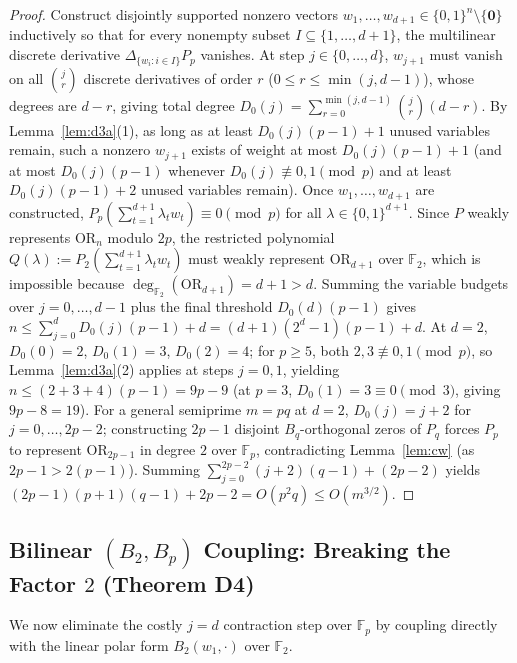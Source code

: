 \documentclass[11pt,a4paper]{article}
\theoremstyle{definition}
\newcommand{\F}{\mathbb{F}}
\newcommand{\OR}{\mathrm{OR}}
\begin{document}
\begin{proof}
Construct disjointly supported nonzero vectors $w_1,\dots,w_{d+1} \in \{0,1\}^n \setminus \{\mathbf{0}\}$ inductively so that for every nonempty subset $I \subseteq \{1,\dots,d+1\}$, the multilinear discrete derivative $\Delta_{\{w_i : i \in I\}} P_p$ vanishes. At step $j \in \{0,\dots,d\}$, $w_{j+1}$ must vanish on all $\binom{j}{r}$ discrete derivatives of order $r$ ($0 \le r \le \min(j, d-1)$), whose degrees are $d - r$, giving total degree $D_0(j) = \sum_{r=0}^{\min(j, d-1)} \binom{j}{r}(d - r)$. By Lemma~\ref{lem:d3a}(1), as long as at least $D_0(j)(p - 1) + 1$ unused variables remain, such a nonzero $w_{j+1}$ exists of weight at most $D_0(j)(p - 1) + 1$ (and at most $D_0(j)(p-1)$ whenever $D_0(j) \not\equiv 0,1 \pmod p$ and at least $D_0(j)(p-1)+2$ unused variables remain).
Once $w_1,\dots,w_{d+1}$ are constructed, $P_p(\sum_{t=1}^{d+1} \lambda_t w_t) \equiv 0 \pmod p$ for all $\lambda \in \{0,1\}^{d+1}$. Since $P$ weakly represents $\OR_n$ modulo $2p$, the restricted polynomial $Q(\lambda) := P_2(\sum_{t=1}^{d+1} \lambda_t w_t)$ must weakly represent $\OR_{d+1}$ over $\F_2$, which is impossible because $\deg_{\F_2}(\OR_{d+1}) = d + 1 > d$.
Summing the variable budgets over $j = 0,\dots,d-1$ plus the final threshold $D_0(d)(p-1)$ gives $n \le \sum_{j=0}^d D_0(j)(p-1) + d = (d+1)(2^d-1)(p-1) + d$. At $d = 2$, $D_0(0) = 2$, $D_0(1) = 3$, $D_0(2) = 4$; for $p \ge 5$, both $2, 3 \not\equiv 0, 1 \pmod p$, so Lemma~\ref{lem:d3a}(2) applies at steps $j=0,1$, yielding $n \le (2+3+4)(p-1) = 9p - 9$ (at $p = 3$, $D_0(1) = 3 \equiv 0 \pmod 3$, giving $9p - 8 = 19$). For a general semiprime $m = pq$ at $d = 2$, $D_0(j) = j + 2$ for $j = 0,\dots,2p-2$; constructing $2p - 1$ disjoint $B_q$-orthogonal zeros of $P_q$ forces $P_p$ to represent $\OR_{2p-1}$ in degree $2$ over $\F_p$, contradicting Lemma~\ref{lem:cw} (as $2p - 1 > 2(p-1)$). Summing $\sum_{j=0}^{2p-2} (j + 2)(q - 1) + (2p - 2)$ yields $(2p-1)(p+1)(q-1) + 2p - 2 = O(p^2 q) \le O(m^{3/2})$.
\end{proof}

\subsection{Bilinear $(B_2, B_p)$ Coupling: Breaking the Factor $2$ (Theorem D4)}

We now eliminate the costly $j = d$ contraction step over $\F_p$ by coupling directly with the linear polar form $B_2(w_1, \cdot)$ over $\F_2$.
\end{document}
